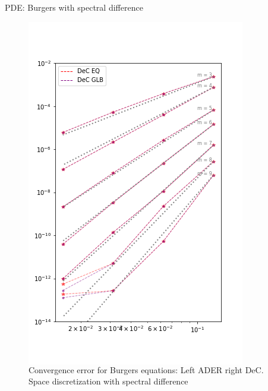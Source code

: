 \documentclass[aspectratio=169]{beamer}
\begin{document}
\begin{frame}{PDE: Burgers with spectral difference}
\begin{figure}
\begin{center}
\begin{columns}
\includegraphics[width=\linewidth,trim={0 55 0 60},clip]{burgers_temp_dec.png}
\caption{Convergence error for Burgers equations: Left ADER right DeC. Space discretization with spectral difference}
\label{fig:advection-conv-dec}
	\end{columns}
\end{center}
\end{figure}

\end{frame}
\end{document}
